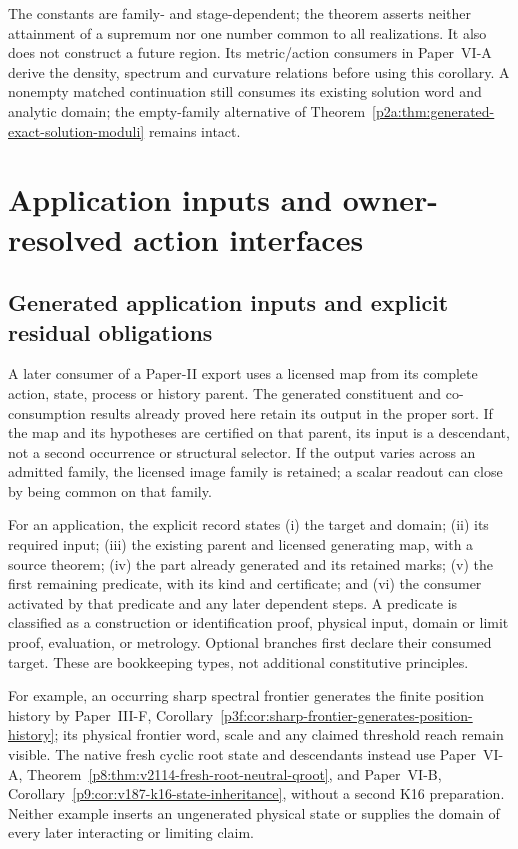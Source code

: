 \documentclass[12pt,a4paper]{article}
\begin{document}
The constants are family- and stage-dependent; the theorem asserts neither
attainment of a supremum nor one number common to all realizations. It also
does not construct a future region. Its metric/action consumers in
Paper~VI-A derive the density, spectrum and curvature relations before using
this corollary. A nonempty matched continuation still consumes its existing
solution word and analytic domain; the empty-family alternative of
Theorem~\ref{p2a:thm:generated-exact-solution-moduli} remains intact.





\section{Application inputs and owner-resolved action interfaces}
\label{p2a:sec:clean-application-inputs}
\subsection{Generated application inputs and explicit residual obligations}
\label{p2a:sec:application-obligation-record}
A later consumer of a Paper-II export uses a licensed map from its complete
action, state, process or history parent. The generated constituent and
co-consumption results already proved here retain its output in the proper
sort. If the map and its hypotheses are certified on that parent, its input
is a descendant, not a second occurrence or structural selector. If the
output varies across an admitted family, the licensed image family is
retained; a scalar readout can close by being common on that family.

For an application, the explicit record states (i) the target and domain;
(ii) its required input; (iii) the existing parent and licensed generating
map, with a source theorem; (iv) the part already generated and its retained
marks; (v) the first remaining predicate, with its kind and certificate;
and (vi) the consumer activated by that predicate and any later dependent
steps. A predicate is classified as a construction or identification proof,
physical input, domain or limit proof, evaluation, or metrology. Optional
branches first declare their consumed target. These are bookkeeping types,
not additional constitutive principles.

For example, an occurring sharp spectral frontier generates the finite
position history by Paper~III-F,
Corollary~\ref{p3f:cor:sharp-frontier-generates-position-history}; its
physical frontier word, scale and any claimed threshold reach remain
visible. The native fresh cyclic root state and descendants instead use
Paper~VI-A, Theorem~\ref{p8:thm:v2114-fresh-root-neutral-qroot}, and
Paper~VI-B, Corollary~\ref{p9:cor:v187-k16-state-inheritance}, without a
second K16 preparation. Neither example inserts an ungenerated physical
state or supplies the domain of every later interacting or limiting claim.
\end{document}
